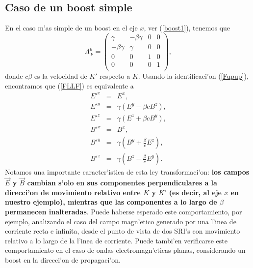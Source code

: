 \subsection{Caso de un boost simple}
En el caso m'as simple de un boost en el eje $x$, ver (\ref{boost1}), tenemos
que
\begin{equation}
\Lambda^\mu_{\ \nu}=\left( \begin{array}{cccc}
\gamma & -\beta\gamma & 0 & 0\\
-\beta\gamma & \gamma & 0 & 0\\
0 & 0 & 1 & 0\\
0 & 0 & 0 & 1\\
\end{array}\right) ,
\end{equation}
donde $c\beta$ es la velocidad de $K'$ respecto a $K$. Usando la identificaci'on
(\ref{Fupup}), encontramos que (\ref{FLLF}) es equivalente a
\begin{eqnarray}
E'^x &=& E^x ,\\
E'^y &=& \gamma ( E^y - \beta cB^z ) ,\\
E'^z &=& \gamma ( E^z + \beta cB^y ) ,\\
B'^x &=& B^x ,\\
B'^y &=& \gamma (B^y + \frac{\beta}{c} E^z) ,\\
B'^z &=& \gamma (B^z - \frac{\beta}{c} E^y).
\end{eqnarray}
Notamos una importante caracter'istica de esta ley transformaci'on: \textbf{los campos $\vec{E}$ y $\vec{B}$ cambian s'olo en sus componentes perpendiculares a la direcci'on de movimiento relativo entre $K$ y $K'$ (es decir, al eje $x$ en nuestro ejemplo), mientras que las componentes a lo largo de $\beta$ permanecen inalteradas}. 
Puede haberse esperado este comportamiento, por ejemplo,
analizando el caso del campo magn'etico generado por una l'inea de corriente
recta e infinita, desde el punto de vista de dos SRI's con movimiento relativo a lo largo de la l'inea de corriente. Puede tambi'en verificarse este comportamiento en el caso de ondas electromagn'eticas planas, considerando un boost en la direcci'on de propagaci'on.

